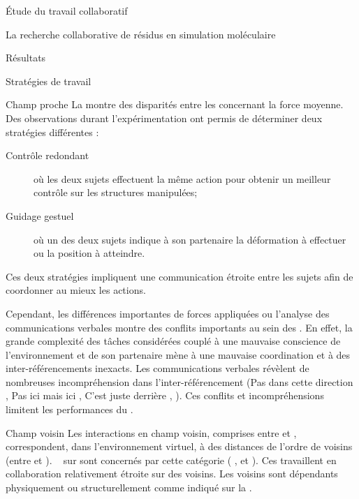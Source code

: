 \documentclass[myfrancais]{mythesis}
\begin{document}
\begin{mypart}{Étude du travail collaboratif}
\begin{mychapter}{La recherche collaborative de résidus en simulation moléculaire}
\begin{mysection}{Résultats}
\begin{mysubsection}{Stratégies de travail}
\begin{mysubsubsection}{Champ proche}
						La  montre des disparités entre les  concernant la force moyenne.
						Des observations durant l'expérimentation ont permis de déterminer deux stratégies différentes :
						\begin{description}
							\item[Contrôle redondant] où les deux sujets effectuent la même action pour obtenir un meilleur contrôle sur les structures manipulées;
							\item[Guidage gestuel] où un des deux sujets indique à son partenaire la déformation à effectuer ou la position à atteindre.
						\end{description}
						Ces deux stratégies impliquent une communication étroite entre les sujets afin de coordonner au mieux les actions.

						Cependant, les différences importantes de forces appliquées  ou l'analyse des communications verbales montre des conflits importants au sein des .
						En effet, la grande complexité des tâches considérées couplé à une mauvaise conscience de l'environnement et de son partenaire mène à une mauvaise coordination et à des inter-référencements inexacts.
						Les communications verbales révèlent de nombreuses incompréhension dans l'inter-référencement (\og Pas dans cette direction \fg, \og Pas ici mais ici \fg, \og C'est juste derrière \fg, \myetc).
						Ces conflits et incompréhensions limitent les performances du .
					\end{mysubsubsection}
					\begin{mysubsubsection}{Champ voisin}
						Les interactions en champ voisin, comprises entre  et , correspondent, dans l'environnement virtuel, à des distances de l'ordre de  voisins (entre  et ).
						~ sur  sont concernés par cette catégorie ( ,  et ).
						Ces  travaillent en collaboration relativement étroite sur des  voisins.
						Les  voisins sont dépendants physiquement ou structurellement comme indiqué sur la .


\end{mysubsubsection}
\end{mysubsection}
\end{mysection}
\end{mychapter}
\end{mypart}
\end{document}
